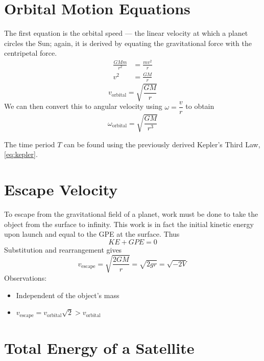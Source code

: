 \documentclass[a4paper,12pt]{article}
\let\oldsection\section
\renewcommand\section{\clearpage\oldsection}
\begin{document}
\section{Orbital Motion Equations}

The first equation is the orbital speed --- the linear velocity at which a planet circles the Sun; again, it is derived by equating the gravitational force with the centripetal force.
\begin{align*}
  \frac{GMm}{r^2} & = \frac{mv^2}{r} \\
  v^2             & = \frac{GM}{r}
\end{align*}
\begin{equation}\label{eq:orbital_speed}
  v_{\text{orbital}}               = \sqrt{\frac{GM}{r}}
\end{equation}
We can then convert this to angular velocity using $\omega = \dfrac{v}{r}$ to obtain
\begin{equation}\label{eq:angular_velocity}
  \omega_{\text{orbital}} = \sqrt{\frac{GM}{r^3}}
\end{equation}

The time period $T$ can be found using the previously derived Kepler's Third Law, \cref{eq:kepler}.

\section{Escape Velocity}

To escape from the gravitational field of a planet, work must be done to take the object from the surface to infinity. This work is in fact the initial kinetic energy upon launch and equal to the GPE at the surface. Thus $$KE + GPE = 0$$
Substitution and rearrangement gives \begin{equation}\label{eq:escape_velocity}
  v_{\text{escape}} = \sqrt{\frac{2GM}{r}} = \sqrt{2gr} = \sqrt{-2V}
\end{equation}
Observations:
\begin{itemize}
  \item Independent of the object's mass
  \item $v_{\text{escape}} = v_\text{orbital}\sqrt{2} > v_{\text{orbital}}$
\end{itemize}

\section{Total Energy of a Satellite}
\end{document}
